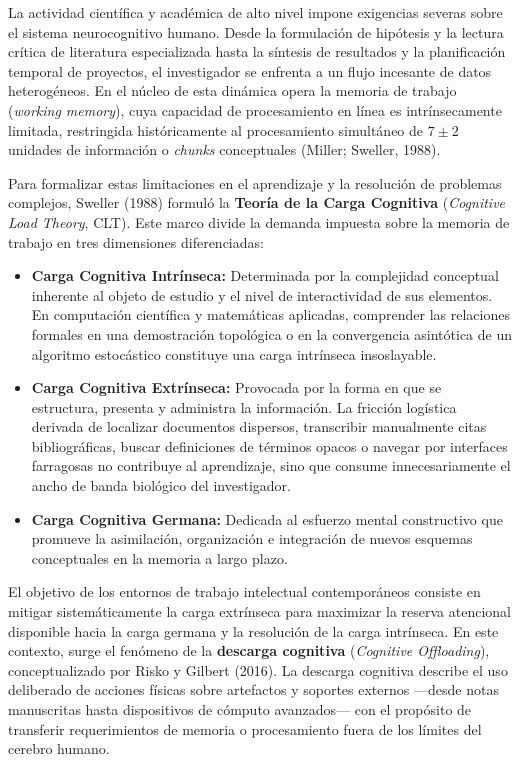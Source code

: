 La actividad científica y académica de alto nivel impone exigencias severas sobre el sistema neurocognitivo humano. Desde la formulación de hipótesis y la lectura crítica de literatura especializada hasta la síntesis de resultados y la planificación temporal de proyectos, el investigador se enfrenta a un flujo incesante de datos heterogéneos. En el núcleo de esta dinámica opera la memoria de trabajo (\textit{working memory}), cuya capacidad de procesamiento en línea es intrínsecamente limitada, restringida históricamente al procesamiento simultáneo de $7 \pm 2$ unidades de información o \textit{chunks} conceptuales (Miller; Sweller, 1988).

Para formalizar estas limitaciones en el aprendizaje y la resolución de problemas complejos, Sweller (1988) formuló la \textbf{Teoría de la Carga Cognitiva} (\textit{Cognitive Load Theory}, CLT). Este marco divide la demanda impuesta sobre la memoria de trabajo en tres dimensiones diferenciadas:

\begin{itemize}
    \item \textbf{Carga Cognitiva Intrínseca:} Determinada por la complejidad conceptual inherente al objeto de estudio y el nivel de interactividad de sus elementos. En computación científica y matemáticas aplicadas, comprender las relaciones formales en una demostración topológica o en la convergencia asintótica de un algoritmo estocástico constituye una carga intrínseca insoslayable.
    \item \textbf{Carga Cognitiva Extrínseca:} Provocada por la forma en que se estructura, presenta y administra la información. La fricción logística derivada de localizar documentos dispersos, transcribir manualmente citas bibliográficas, buscar definiciones de términos opacos o navegar por interfaces farragosas no contribuye al aprendizaje, sino que consume innecesariamente el ancho de banda biológico del investigador.
    \item \textbf{Carga Cognitiva Germana:} Dedicada al esfuerzo mental constructivo que promueve la asimilación, organización e integración de nuevos esquemas conceptuales en la memoria a largo plazo.
\end{itemize}

El objetivo de los entornos de trabajo intelectual contemporáneos consiste en mitigar sistemáticamente la carga extrínseca para maximizar la reserva atencional disponible hacia la carga germana y la resolución de la carga intrínseca. En este contexto, surge el fenómeno de la \textbf{descarga cognitiva} (\textit{Cognitive Offloading}), conceptualizado por Risko y Gilbert (2016). La descarga cognitiva describe el uso deliberado de acciones físicas sobre artefactos y soportes externos ---desde notas manuscritas hasta dispositivos de cómputo avanzados--- con el propósito de transferir requerimientos de memoria o procesamiento fuera de los límites del cerebro humano.


